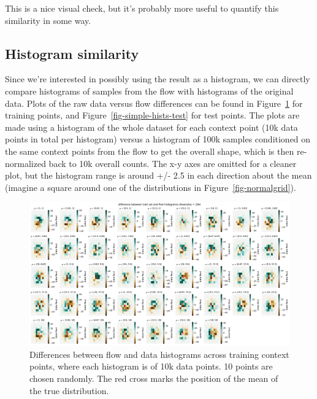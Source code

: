 \documentclass[
  11pt,
  numbers=noendperiod]{book}
\begin{document}
This is a nice visual check, but it's probably more useful to quantify
this similarity in some way.

\hypertarget{histogram-similarity}{%
\subsection{Histogram similarity}\label{histogram-similarity}}

Since we're interested in possibly using the result as a histogram, we
can directly compare histograms of samples from the flow with histograms
of the original data. Plots of the raw data versus flow differences can
be found in Figure~\ref{fig-simple-hists-train} for training points, and
Figure~\ref{fig-simple-hists-test} for test points. The plots are made
using a histogram of the whole dataset for each context point (10k data
points in total per histogram) versus a histogram of 100k samples
conditioned on the same context points from the flow to get the overall
shape, which is then re-normalized back to 10k overall counts. The x-y
axes are omitted for a cleaner plot, but the histogram range is around
+/- 2.5 in each direction about the mean (imagine a square around one of
the distributions in Figure~\ref{fig-normalgrid}).

\begin{figure}

{\centering \includegraphics{./images/flows/simple/simplehistdifftrain-reallyunscaled.pdf}

}

\caption{\label{fig-simple-hists-train}Differences between flow and data
histograms across training context points, where each histogram is of
10k data points. 10 points are chosen randomly. The red cross marks the position of the mean of the
true distribution.}

\end{figure}
\end{document}
